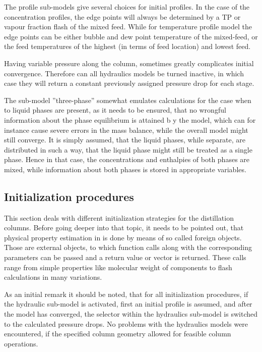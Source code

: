     The profile sub-models give several choices for initial profiles. In the case of the concentration profiles, the edge points
    will always be determined by a TP or vapour fraction flash of the mixed feed. While for temperature profile model the
    edge points can be either bubble and dew point temperature of the mixed-feed, or the feed temperatures of the highest
    (in terms of feed location) and lowest feed.

    Having variable pressure along the column, sometimes greatly complicates initial convergence. Therefore can all hydraulics
    models be turned inactive, in which case they will return a constant previously assigned pressure drop for each stage.

    The sub-model ''three-phase'' somewhat emulates calculations for the case when to liquid phases are present,
    as it needs to be ensured, that no wrongful information about the phase equilibrium is attained b y
    the model, which can for instance cause severe errors in the mass balance, while the overall model
    might still converge. It is simply assumed, that the liquid phases, while separate, are distributed
    in such a way, that the liquid phase might still be treated as a single phase. Hence in that case,
    the concentrations and enthalpies of both phases are mixed, while information about both phases is stored
    in appropriate variables.

\subsection{Initialization procedures}

    This section deals with different initialization strategies for the distillation columns. Before going
    deeper into that topic, it needs to be pointed out, that physical property estimation in \gproms is done
    by means of so called foreign objects. Those are external objects, to which function calls along with
    the corresponding parameters can be passed and a return value or vector is returned. These calls range
    from simple properties like molecular weight of components to flash calculations in many variations.

    As an initial remark it should be noted, that for all initialization procedures, if the hydraulic
    sub-model is activated, first an initial profile is assumed, and after the model has converged,
    the selector within the hydraulics sub-model is switched to the calculated pressure drops. No problems
    with the hydraulics models were encountered, if the specified column geometry allowed for feasible
    column operations.

